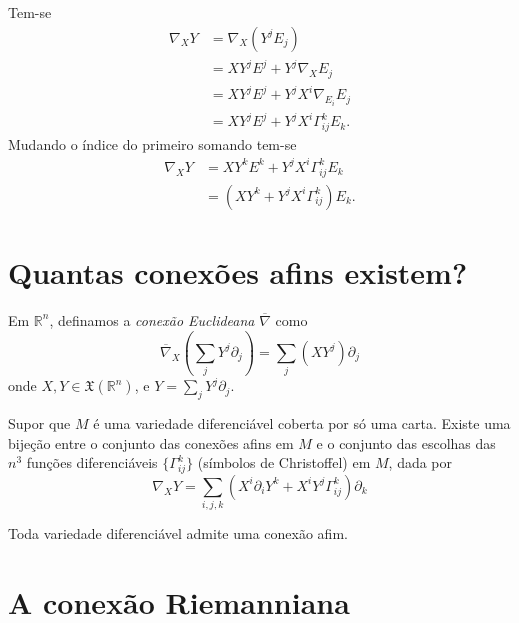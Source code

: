 \begin{demonstracao}
	Tem-se
	\begin{align*}
		\nabla_X Y &= \nabla_X (Y^j E_j)\\
		&= X Y^j E^j + Y^j \nabla_X E_j\\
		&= X Y^j E^j + Y^j X^i \nabla_{E_i} E_j\\
		&= X Y^j E^j + Y^j X^i \Gamma^k_{ij} E_k.
	\end{align*}
	Mudando o índice do primeiro somando tem-se
	\begin{align*}
		\nabla_X Y &= X Y^k E^k + Y^j X^i \Gamma^k_{ij} E_k\\
		&= (X Y^k + Y^j X^i \Gamma^k_{ij}) E_k.
	\end{align*}
\end{demonstracao}

\section{Quantas conexões afins existem?}

\begin{definicao}
	Em $\mathbb{R}^n$, definamos a \emph{conexão Euclideana} $\overline{\nabla}$ como
	\begin{equation*}
		\overline{\nabla}_X \left( \sum_j Y^j \partial_j \right) = \sum_j \left( X Y^j \right) \partial_j
	\end{equation*}
	onde $X,Y \in \mathfrak{X}(\mathbb{R}^n)$, e $Y = \sum_j Y^j \partial_j$.
\end{definicao}

\begin{lema}
	Supor que $M$ é uma variedade diferenciável coberta por só uma carta. Existe uma bijeção entre o conjunto das conexões afins em $M$ e o conjunto das escolhas das $n^3$ funções diferenciáveis $\{ \Gamma^k_{ij} \}$ (símbolos de Christoffel) em $M$, dada por
	\begin{equation*}
		\nabla_X Y = \sum_{i,j,k} \left( X^i \partial_i Y^k + X^i Y^j \Gamma^k_{ij} \right) \partial_k
	\end{equation*}
\end{lema}

\begin{proposicao}
	Toda variedade diferenciável admite uma conexão afim.
\end{proposicao}


\section{A conexão Riemanniana}

